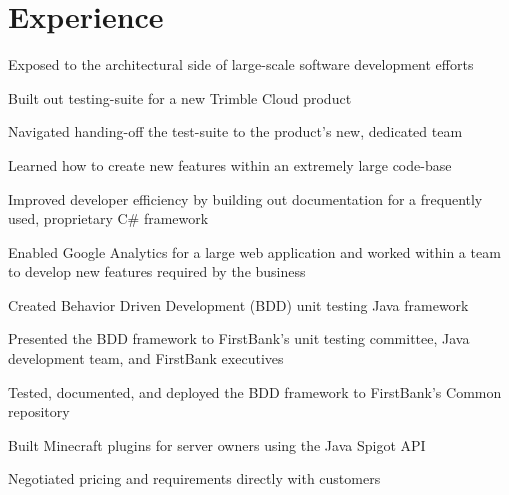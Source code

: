 \documentclass[]{darling-resume-openfont}
\begin{document}
\hfill
\begin{minipage}[t]{0.66\textwidth} 


\section{Experience}
\vspace{\topsep} %
\begin{tightemize}
\item Exposed to the architectural side of large-scale software development efforts
\item Built out testing-suite for a new Trimble Cloud product
\item Navigated handing-off the test-suite to the product's new, dedicated team
\end{tightemize}
\sectionsep

\begin{tightemize}
\item Learned how to create new features within an extremely large code-base
\item Improved developer efficiency by building out documentation for a frequently used, proprietary C\#{} framework
\item Enabled Google Analytics for a large web application and worked within a team to develop new features required by the business
\end{tightemize}
\sectionsep

\begin{tightemize}
\item Created Behavior Driven Development (BDD) unit testing Java framework
\item Presented the BDD framework to FirstBank's unit testing committee, Java development team, and FirstBank executives
\item Tested, documented, and deployed the BDD framework to FirstBank's Common repository
\end{tightemize}
\sectionsep

\begin{tightemize}
\item Built Minecraft plugins for server owners using the Java Spigot API
\item Negotiated pricing and requirements directly with customers
\end{tightemize}
\sectionsep


\end{minipage}
\end{document}
